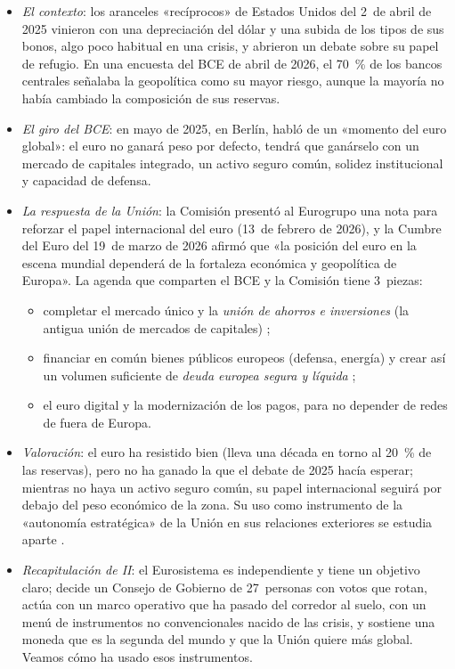 \documentclass[11pt]{article}
\begin{document}
\begin{itemize}
\item \emph{El contexto}: los aranceles «recíprocos» de Estados Unidos del 2~de abril de 2025 vinieron con una depreciación del dólar y una subida de los tipos de sus bonos, algo poco habitual en una crisis, y abrieron un debate sobre su papel de refugio. En una encuesta del BCE de abril de 2026, el 70~\% de los bancos centrales señalaba la geopolítica como su mayor riesgo, aunque la mayoría no había cambiado la composición de sus reservas\nocite{BCE2026PapelEuro}.
\item \emph{El giro del BCE}: en mayo de 2025, en Berlín,  habló de un «momento del euro global»: el euro no ganará peso por defecto, tendrá que ganárselo con un mercado de capitales integrado, un activo seguro común, solidez institucional y capacidad de defensa\nocite{Lagarde2025Influencia}.
\item \emph{La respuesta de la Unión}: la Comisión presentó al Eurogrupo una nota para reforzar el papel internacional del euro (13~de febrero de 2026), y la Cumbre del Euro del 19~de marzo de 2026 afirmó que «la posición del euro en la escena mundial dependerá de la fortaleza económica y geopolítica de Europa»\nocite{BCE2026PapelEuro}. La agenda que comparten el BCE y la Comisión tiene 3~piezas:
  \begin{itemize}
  \item completar el mercado único y la \emph{unión de ahorros e inversiones} (la antigua unión de mercados de capitales) ;
  \item financiar en común bienes públicos europeos (defensa, energía) y crear así un volumen suficiente de \emph{deuda europea segura y líquida} ;
  \item el euro digital y la modernización de los pagos, para no depender de redes de fuera de Europa.
  \end{itemize}
\item \emph{Valoración}: el euro ha resistido bien (lleva una década en torno al 20~\% de las reservas\nocite{FMI2026COFERNota}), pero no ha ganado la que el debate de 2025 hacía esperar; mientras no haya un activo seguro común, su papel internacional seguirá por debajo del peso económico de la zona. Su uso como instrumento de la «autonomía estratégica» de la Unión en sus relaciones exteriores se estudia aparte .
\end{itemize}

\begin{itemize}
\item \emph{Recapitulación de II}: el Eurosistema es independiente y tiene un objetivo claro; decide un Consejo de Gobierno de 27~personas con votos que rotan, actúa con un marco operativo que ha pasado del corredor al suelo, con un menú de instrumentos no convencionales nacido de las crisis, y sostiene una moneda que es la segunda del mundo y que la Unión quiere más global. Veamos cómo ha usado esos instrumentos.
\end{itemize}
\end{document}

